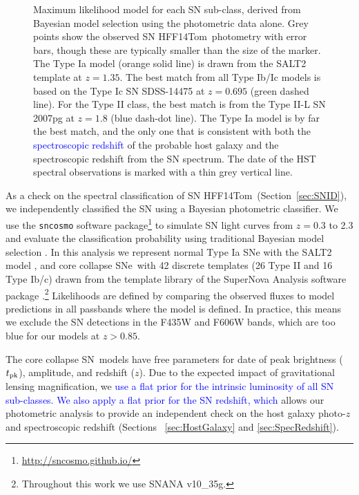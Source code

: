\documentclass[iop]{emulateapj}
\newcommand{\change}[1]{{ \textcolor{blue}{#1}}}
\newcommand{\change}[1]{#1}
\def\tomas{HFF14Tom}
\newcommand{\CCSN}{core collapse SN}
\newcommand{\CCSNe}{core collapse SNe}
\begin{document}
\begin{figure}
\begin{center}
\caption{ 
Maximum likelihood model for each SN sub-class, derived from Bayesian
model selection using the photometric data alone. Grey points show the
observed SN \tomas\ photometry with error bars, though these are
typically smaller than the size of the marker.  The Type Ia model
(orange solid line) is drawn from the SALT2 template at $z=1.35$. The
best match from all Type Ib/Ic models is based on the Type Ic SN
SDSS-14475 at $z=0.695$ (green dashed line). For the Type II class,
the best match is from the Type II-L SN 2007pg at $z=1.8$ (blue
dash-dot line). The Type Ia model is by far the best match, and the
only one that is consistent with both the \change{spectroscopic
redshift} of the probable host galaxy and the spectroscopic redshift
from the SN spectrum.  The date of the HST spectral observations is
marked with a thin grey vertical line.
\label{fig:photoclass} }
\end{center}
\end{figure}

As a check on the spectral classification of SN \tomas\
(Section~\ref{sec:SNID}), we independently classified the SN using a
Bayesian photometric classifier.  We use the {\tt sncosmo} software
package\footnote{\url{http://sncosmo.github.io/}} to simulate SN light
curves from $z=0.3$ to 2.3 and evaluate the classification probability
using traditional Bayesian model selection \citep[as
in][]{Jones:2013,Rodney:2014,Graur:2014,Rodney:2015b}.  In this
analysis we represent normal Type Ia SNe with the SALT2
model \citep{Guy:2010}, and \CCSNe\ with 42 discrete templates (26
Type II and 16 Type Ib/c) drawn from the template library of the
SuperNova Analysis software
package \citep[SNANA,][]{Kessler:2009a}.\footnote{Throughout this work
we use SNANA v10\_35g.}  Likelihoods are defined by comparing the
observed fluxes to model predictions in all passbands where the model
is defined.  In practice, this means we exclude the SN detections in
the F435W and F606W bands, which are too blue for our models at
$z>0.85$.

The \CCSN\ models have free parameters for date of peak brightness
($t_{\rm pk}$), amplitude, and redshift ($z$). Due to the expected
impact of gravitational lensing magnification, we \change{use a flat
prior for the intrinsic luminosity of all SN sub-classes.  We also
apply a flat prior for the SN redshift, which} allows our photometric
analysis to provide an independent check on the host galaxy photo-$z$
and spectroscopic redshift (Sections~\change{\ref{sec:HostGalaxy}}
and \ref{sec:SpecRedshift}).
\end{document}
